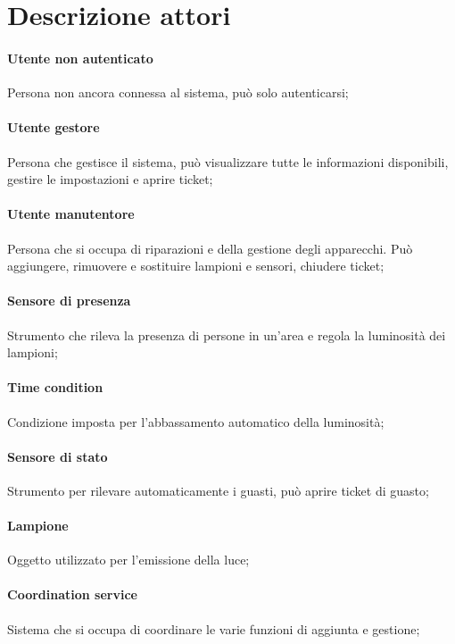 \section{Descrizione attori}
\paragraph{Utente non autenticato} 
Persona non ancora connessa al sistema, può solo autenticarsi;

\paragraph{Utente gestore} 
Persona che gestisce il sistema, può visualizzare tutte le informazioni disponibili, gestire le impostazioni e aprire ticket;

\paragraph{Utente manutentore} 
Persona che si occupa di riparazioni e della gestione degli apparecchi. Può aggiungere, rimuovere e sostituire lampioni e sensori, chiudere ticket;

\paragraph{Sensore di presenza} 
Strumento che rileva la presenza di persone in un'area e regola la luminosità dei lampioni;

\paragraph{Time condition}
Condizione imposta per l'abbassamento automatico della luminosità;

\paragraph{Sensore di stato} 
Strumento per rilevare automaticamente i guasti, può aprire ticket di guasto;

\paragraph{Lampione} 
Oggetto utilizzato per l'emissione della luce;

\paragraph{Coordination service} 
Sistema che si occupa di coordinare le varie funzioni di aggiunta e gestione;


